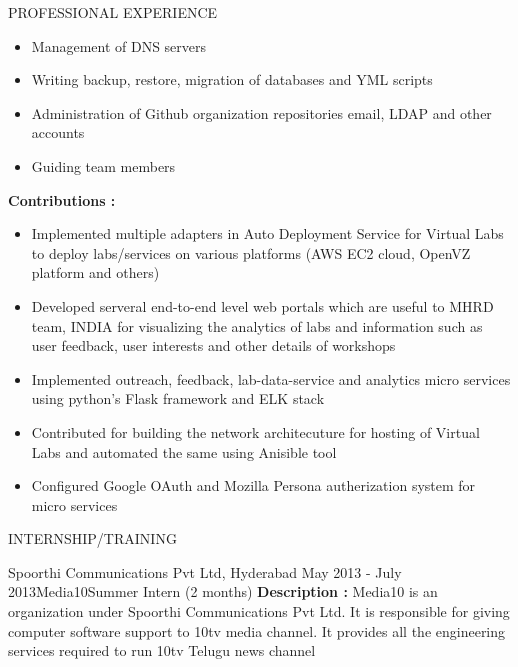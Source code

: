 \documentclass{resume} %
\begin{document}
\begin{rSection}{PROFESSIONAL EXPERIENCE}
\begin{rSubsection}
\begin{itemize}
    \item Management of DNS servers

    \item Writing backup, restore, migration of databases
      and YML scripts

    \item Administration of Github organization repositories
      email, LDAP and other accounts

    \item Guiding team members
    \end{itemize}

    \hfill

    \textbf{Contributions : }
    \begin{itemize}

    \item Implemented multiple adapters in Auto Deployment
      Service for Virtual Labs to deploy labs/services on
      various platforms (AWS EC2 cloud, OpenVZ platform and
      others)
      
    \item Developed serveral end-to-end level web portals
      which are useful to MHRD team, INDIA for visualizing
      the analytics of labs and information such as user
      feedback, user interests and other details of
      workshops
      
    \item Implemented outreach, feedback, lab-data-service
      and analytics micro services using python's Flask
      framework and ELK stack
      
    \item Contributed for building the network architecuture
      for hosting of Virtual Labs and automated the same
      using Anisible tool

    \item Configured Google OAuth and Mozilla Persona
      autherization system for micro services
    \end{itemize}
 
  \end{rSubsection}

\end{rSection}


\begin{rSection}{INTERNSHIP/TRAINING}
  \begin{rSubsection}
  {Spoorthi Communications Pvt Ltd, Hyderabad} {May 2013 -
    July 2013}{Media10}{Summer Intern (2 months)}
  \textbf{Description :} Media10 is an organization under
  Spoorthi Communications Pvt Ltd. It is responsible for
  giving computer software support to 10tv media channel. It
  provides all the engineering services required to run 10tv
  Telugu news channel
  \end{rSubsection} 

\end{rSection} 
\end{document}
